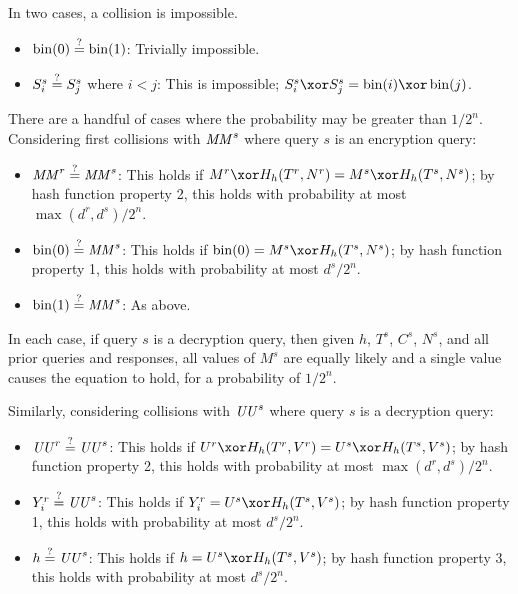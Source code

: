 \documentclass[hctr.tex]{subfiles}
\begin{document}
In two cases, a collision is impossible.

\begin{itemize}
    \item \(\operatorname{bin}(0) \stackrel{\text{?}}{=} \operatorname{bin}(1)\): 
    Trivially impossible.
    \item 
    \(S_i^s \stackrel{\text{?}}{=} S_j^s\) where \(i < j\):
    This is impossible; 
    \(S_i^s \xor S_j^s = \fromint(i) \xor \fromint(j)\).
\end{itemize}

There are a handful of cases where the probability may
be greater than \(1/2^n\).
Considering first collisions with \(\mathit{MM}^s\) where
query \(s\) is an encryption query:

\begin{itemize}
    \item \(\mathit{MM}^r \stackrel{\text{?}}{=} \mathit{MM}^s\):
    This holds if \(M^r \xor H_h(T^r, N^r) = M^s \xor H_h(T^s, N^s)\);
    by hash function property 2, this holds with probability at most
    \(\max(d^r, d^s)/2^n\).
    \item \(\operatorname{bin}(0) \stackrel{\text{?}}{=} \mathit{MM}^s\):
    This holds if \(\fromint(0) = M^s \xor H_h(T^s, N^s)\);
    by hash function property 1, this holds with probability at most
    \(d^s/2^n\).
    \item \(\operatorname{bin}(1) \stackrel{\text{?}}{=} \mathit{MM}^s\):
    As above.
\end{itemize}

In each case, if query \(s\) is a decryption query,
then given \(h\), \(T^s\), \(C^s\), \(N^s\),
and all prior queries and responses,
all values of \(M^s\) are equally likely 
and a single value causes the equation to hold,
for a probability of \(1/2^n\).

Similarly, considering collisions with \(\mathit{UU}^s\) where
query \(s\) is a decryption query:

\begin{itemize}
    \item \(\mathit{UU}^r \stackrel{\text{?}}{=} \mathit{UU}^s\): 
    This holds if \(U^r \xor H_h(T^r, V^r) = U^s \xor H_h(T^s, V^s)\);
    by hash function property 2, this holds with probability at most
    \(\max(d^r, d^s)/2^n\).
    \item \(Y_i^r \stackrel{\text{?}}{=} \mathit{UU}^s\):
    This holds if \(Y_i^r = U^s \xor H_h(T^s, V^s)\);
    by hash function property 1, this holds with probability at most
    \(d^s/2^n\).
    \item \(h \stackrel{\text{?}}{=} \mathit{UU}^s\):
    This holds if \(h = U^s \xor H_h(T^s, V^s)\);
    by hash function property 3, this holds with probability at most
    \(d^s/2^n\).
\end{itemize}
\end{document}
